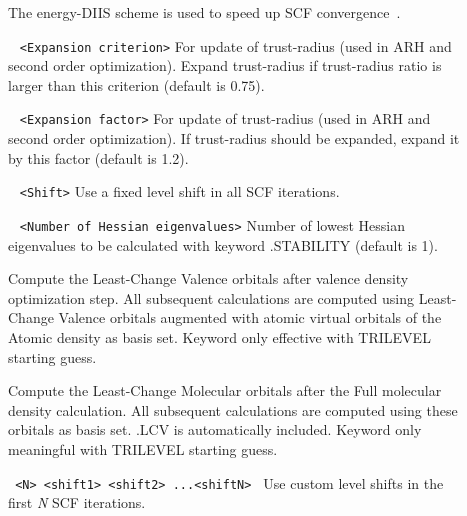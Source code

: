 \begin{description}
\item[] The energy-DIIS scheme is used to speed up SCF convergence~\cite{ediis}.
\item[] \verb| | \newline
\verb|<Expansion criterion>|\newline 
For update of trust-radius (used in ARH and second order optimization). Expand trust-radius
if trust-radius ratio is larger than this criterion (default is 0.75).
\item[] \verb| | \newline
\verb|<Expansion factor>|\newline 
For update of trust-radius (used in ARH and second order optimization). If trust-radius
should be expanded,
expand it by this factor (default is 1.2).
\item[] \verb| | \newline
\verb|<Shift>|\newline 
Use a fixed level shift in all SCF iterations.
\item[] \verb| | \newline
\verb|<Number of Hessian eigenvalues>|\newline
Number of lowest Hessian eigenvalues to be calculated with keyword .STABILITY 
(default is 1). 
\item[] Compute the Least-Change Valence orbitals after valence density optimization step.
All subsequent calculations are computed using Least-Change Valence orbitals augmented with atomic virtual orbitals of the Atomic density as basis set.
Keyword only effective with TRILEVEL starting guess.
\item[]  Compute the Least-Change Molecular orbitals after the Full molecular density calculation.  All subsequent calculations are computed using these orbitals as basis set. .LCV is automatically included. Keyword only meaningful with TRILEVEL starting guess.
\item[] \verb| | \newline
\verb|<N> <shift1> <shift2> ...<shiftN> |\newline 
Use custom level shifts in the first {\it N} SCF iterations.


\end{description}
